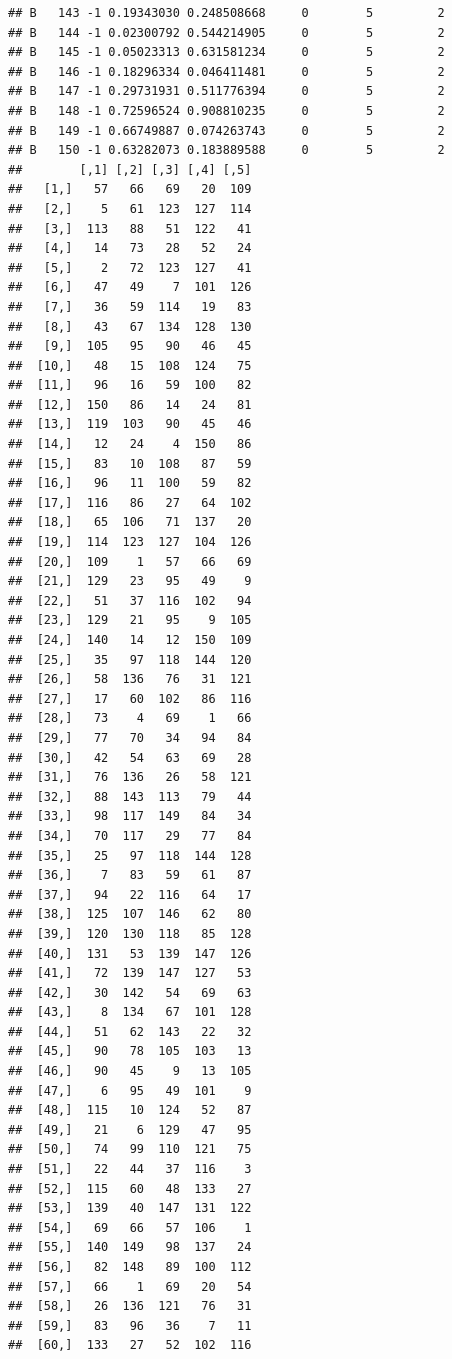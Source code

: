 \documentclass{article}\usepackage[]{graphicx}\usepackage[]{color}
\makeatletter
\newenvironment{kframe}{%
 \def\at@end@of@kframe{}%
 \ifinner\ifhmode%
  \def\at@end@of@kframe{\end{minipage}}%
  \begin{minipage}{\columnwidth}%
 \fi\fi%
 \def\FrameCommand##1{\hskip\@totalleftmargin \hskip-\fboxsep
 \colorbox{shadecolor}{##1}\hskip-\fboxsep
     \hskip-\linewidth \hskip-\@totalleftmargin \hskip\columnwidth}%
 \MakeFramed {\advance\hsize-\width
   \@totalleftmargin\z@ \linewidth\hsize
   \@setminipage}}%
 {\par\unskip\endMakeFramed%
 \at@end@of@kframe}
\newenvironment{knitrout}{}{} %
\makeatother
\begin{document}
\begin{knitrout}
\begin{kframe}
\begin{verbatim}
## B   143 -1 0.19343030 0.248508668     0        5         2
## B   144 -1 0.02300792 0.544214905     0        5         2
## B   145 -1 0.05023313 0.631581234     0        5         2
## B   146 -1 0.18296334 0.046411481     0        5         2
## B   147 -1 0.29731931 0.511776394     0        5         2
## B   148 -1 0.72596524 0.908810235     0        5         2
## B   149 -1 0.66749887 0.074263743     0        5         2
## B   150 -1 0.63282073 0.183889588     0        5         2
##        [,1] [,2] [,3] [,4] [,5]
##   [1,]   57   66   69   20  109
##   [2,]    5   61  123  127  114
##   [3,]  113   88   51  122   41
##   [4,]   14   73   28   52   24
##   [5,]    2   72  123  127   41
##   [6,]   47   49    7  101  126
##   [7,]   36   59  114   19   83
##   [8,]   43   67  134  128  130
##   [9,]  105   95   90   46   45
##  [10,]   48   15  108  124   75
##  [11,]   96   16   59  100   82
##  [12,]  150   86   14   24   81
##  [13,]  119  103   90   45   46
##  [14,]   12   24    4  150   86
##  [15,]   83   10  108   87   59
##  [16,]   96   11  100   59   82
##  [17,]  116   86   27   64  102
##  [18,]   65  106   71  137   20
##  [19,]  114  123  127  104  126
##  [20,]  109    1   57   66   69
##  [21,]  129   23   95   49    9
##  [22,]   51   37  116  102   94
##  [23,]  129   21   95    9  105
##  [24,]  140   14   12  150  109
##  [25,]   35   97  118  144  120
##  [26,]   58  136   76   31  121
##  [27,]   17   60  102   86  116
##  [28,]   73    4   69    1   66
##  [29,]   77   70   34   94   84
##  [30,]   42   54   63   69   28
##  [31,]   76  136   26   58  121
##  [32,]   88  143  113   79   44
##  [33,]   98  117  149   84   34
##  [34,]   70  117   29   77   84
##  [35,]   25   97  118  144  128
##  [36,]    7   83   59   61   87
##  [37,]   94   22  116   64   17
##  [38,]  125  107  146   62   80
##  [39,]  120  130  118   85  128
##  [40,]  131   53  139  147  126
##  [41,]   72  139  147  127   53
##  [42,]   30  142   54   69   63
##  [43,]    8  134   67  101  128
##  [44,]   51   62  143   22   32
##  [45,]   90   78  105  103   13
##  [46,]   90   45    9   13  105
##  [47,]    6   95   49  101    9
##  [48,]  115   10  124   52   87
##  [49,]   21    6  129   47   95
##  [50,]   74   99  110  121   75
##  [51,]   22   44   37  116    3
##  [52,]  115   60   48  133   27
##  [53,]  139   40  147  131  122
##  [54,]   69   66   57  106    1
##  [55,]  140  149   98  137   24
##  [56,]   82  148   89  100  112
##  [57,]   66    1   69   20   54
##  [58,]   26  136  121   76   31
##  [59,]   83   96   36    7   11
##  [60,]  133   27   52  102  116

\end{verbatim}
\end{kframe}
\end{knitrout}
\end{document}
